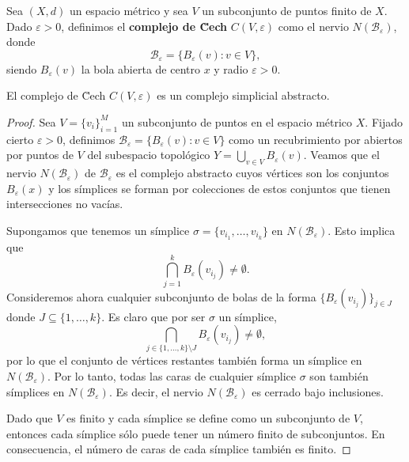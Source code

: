 \begin{definicion}
	Sea \((X,d)\) un espacio métrico y sea \(V\) un subconjunto de puntos finito de \(X\). Dado \(\varepsilon > 0\), definimos el \textbf{complejo de \u Cech} \(C(V, \varepsilon)\) como el nervio \(N(\mathcal{B}_\varepsilon)\), donde
	\[
		\mathcal{B}_\varepsilon = \{ B_{\varepsilon}(v) : v \in V \},
	\]
	siendo \(B_{\varepsilon}(v)\) la bola abierta de centro \(x\) y radio \(\varepsilon > 0\).
\end{definicion}

\begin{proposicion}
	El complejo de \u Cech \(C(V, \varepsilon)\) es un complejo simplicial abstracto.
\end{proposicion}
\begin{proof}
	Sea \( V = \{v_i\}_{i=1}^M \) un subconjunto de puntos en el espacio métrico \( X \). Fijado cierto \(\varepsilon > 0\), definimos \( \mathcal{B}_\varepsilon = \{B_\varepsilon(v) : v \in V \} \) como un recubrimiento por abiertos por puntos de \( V \) del subespacio topológico $Y = \bigcup_{v \in V} B_\varepsilon(v)$. Veamos que el nervio \( N(\mathcal{B}_\varepsilon) \) de \( \mathcal{B}_\varepsilon \) es el complejo abstracto cuyos vértices son los conjuntos \( B_\varepsilon(x) \) y los símplices se forman por colecciones de estos conjuntos que tienen intersecciones no vacías.
	
	Supongamos que tenemos un símplice \( \sigma = \{v_{i_1}, \ldots, v_{i_k}\} \) en \( N(\mathcal{B}_\varepsilon) \). Esto implica que
	\[
	\bigcap_{j=1}^k B_\varepsilon(v_{i_j}) \neq \emptyset.
	\]
	Consideremos ahora cualquier subconjunto de bolas de la forma  \(\{B_\varepsilon(v_{i_j})\}_{j \in J}\) donde \( J \subseteq \{1, \ldots, k\} \). Es claro que por ser $\sigma$ un símplice, 
	\[
	\bigcap_{j \in \{1, \ldots, k\} \setminus J} B_\varepsilon(v_{i_j}) \neq \emptyset,
	\]
	por lo que el conjunto de vértices restantes también forma un símplice en \( N(\mathcal{B}_\varepsilon) \). Por lo tanto, todas las caras de cualquier símplice \( \sigma \) son también símplices en \( N(\mathcal{B}_\varepsilon) \). Es decir, el nervio \( N(\mathcal{B}_\varepsilon) \) es cerrado bajo inclusiones.
	
	Dado que \( V \) es finito y cada símplice se define como un subconjunto de \( V \), entonces cada símplice sólo puede tener un número finito de subconjuntos. En consecuencia, el número de caras de cada símplice también es finito.
\end{proof}

